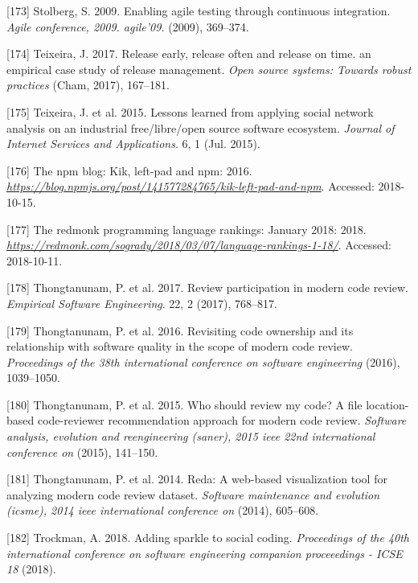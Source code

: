 \documentclass[]{book}
\begin{document}
\hypertarget{ref-stolberg2009enabling}{}
{[}173{]} Stolberg, S. 2009. Enabling agile testing through continuous
integration. \emph{Agile conference, 2009. agile'09.} (2009), 369--374.

\hypertarget{ref-teixeira2017a}{}
{[}174{]} Teixeira, J. 2017. Release early, release often and release on
time. an empirical case study of release management. \emph{Open source
systems: Towards robust practices} (Cham, 2017), 167--181.

\hypertarget{ref-Teixeira2015}{}
{[}175{]} Teixeira, J. et al. 2015. Lessons learned from applying social
network analysis on an industrial free/libre/open source software
ecosystem. \emph{Journal of Internet Services and Applications}. 6, 1
(Jul. 2015).

\hypertarget{ref-NPM2016}{}
{[}176{]} The npm blog: Kik, left-pad and npm: 2016.
\emph{\url{https://blog.npmjs.org/post/141577284765/kik-left-pad-and-npm}}.
Accessed: 2018-10-15.

\hypertarget{ref-RedMonk2018}{}
{[}177{]} The redmonk programming language rankings: January 2018: 2018.
\emph{\url{https://redmonk.com/sogrady/2018/03/07/language-rankings-1-18/}}.
Accessed: 2018-10-11.

\hypertarget{ref-thongtanunam2017review}{}
{[}178{]} Thongtanunam, P. et al. 2017. Review participation in modern
code review. \emph{Empirical Software Engineering}. 22, 2 (2017),
768--817.

\hypertarget{ref-thongtanunam2016revisiting}{}
{[}179{]} Thongtanunam, P. et al. 2016. Revisiting code ownership and
its relationship with software quality in the scope of modern code
review. \emph{Proceedings of the 38th international conference on
software engineering} (2016), 1039--1050.

\hypertarget{ref-thongtanunam2015should}{}
{[}180{]} Thongtanunam, P. et al. 2015. Who should review my code? A
file location-based code-reviewer recommendation approach for modern
code review. \emph{Software analysis, evolution and reengineering
(saner), 2015 ieee 22nd international conference on} (2015), 141--150.

\hypertarget{ref-thongtanunam2014reda}{}
{[}181{]} Thongtanunam, P. et al. 2014. Reda: A web-based visualization
tool for analyzing modern code review dataset. \emph{Software
maintenance and evolution (icsme), 2014 ieee international conference
on} (2014), 605--608.

\hypertarget{ref-Trockman2018}{}
{[}182{]} Trockman, A. 2018. Adding sparkle to social coding.
\emph{Proceedings of the 40th international conference on software
engineering companion proceeedings - ICSE 18} (2018).
\end{document}
